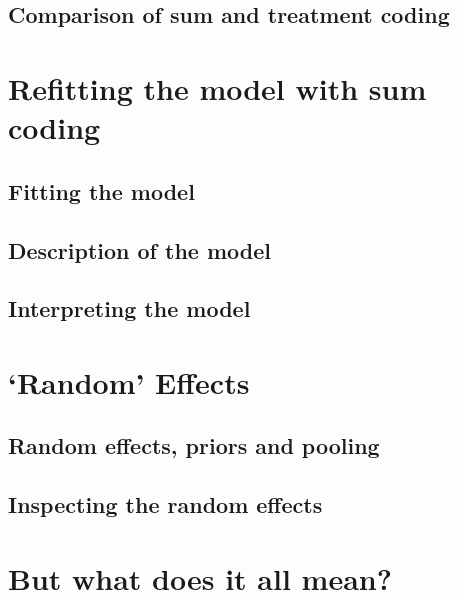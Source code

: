 \documentclass[
]{book}
\begin{document}
\hypertarget{comparison-of-sum-and-treatment-coding}{%
\subsection{Comparison of sum and treatment coding}\label{comparison-of-sum-and-treatment-coding}}

\hypertarget{refitting-the-model-with-sum-coding}{%
\section{Refitting the model with sum coding}\label{refitting-the-model-with-sum-coding}}

\hypertarget{fitting-the-model-2}{%
\subsection{Fitting the model}\label{fitting-the-model-2}}

\hypertarget{description-of-the-model-2}{%
\subsection{Description of the model}\label{description-of-the-model-2}}

\hypertarget{interpreting-the-model-1}{%
\subsection{Interpreting the model}\label{interpreting-the-model-1}}

\hypertarget{random-effects}{%
\section{`Random' Effects}\label{random-effects}}

\hypertarget{random-effects-priors-and-pooling}{%
\subsection{Random effects, priors and pooling}\label{random-effects-priors-and-pooling}}

\hypertarget{inspecting-the-random-effects}{%
\subsection{Inspecting the random effects}\label{inspecting-the-random-effects}}

\hypertarget{but-what-does-it-all-mean}{%
\section{But what does it all mean?}\label{but-what-does-it-all-mean}}
\end{document}

